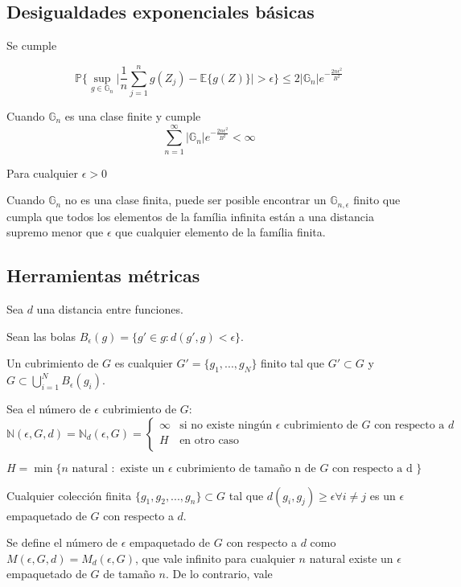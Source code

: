 \documentclass[12pt, a4paper]{article}
\begin{document}
\subsection{Desigualdades exponenciales básicas}
Se cumple 

$$ \mathds{P} \Bigg \{ \mathop{sup}_{g \in \mathds{G}_n} \Bigg | \frac{1}{n} \sum_{j=1}^{n} g(Z_j)-\mathds{E}\{ g(Z) \} \Bigg | > \epsilon \Bigg \} \leq 2 | \mathds{G}_n| e^{-\frac{2n\epsilon^2}{B^2}} $$

Cuando $\mathds{G}_n$ es una clase finite y cumple
$$ \sum_{n=1}^{\infty} |\mathds{G}_n| e^{- \frac{2n\epsilon^2}{B^2}} < \infty$$

Para cualquier $\epsilon>0$

Cuando $\mathds{G}_n$ no es una clase finita, puede ser posible encontrar un $\mathds{G}_{n,\epsilon}$ finito que cumpla que todos los elementos de la família infinita están a una distancia supremo menor que $\epsilon$ que cualquier elemento de la família finita.

\subsection{Herramientas métricas}

Sea $d$ una distancia entre funciones.

Sean las bolas $B_{\epsilon}(g)=\{ g' \in g:d(g',g)<\epsilon \}$.

Un cubrimiento de $G$ es cualquier $G'=\{ g_1,..., g_N \}$ finito tal que $G' \subset G $ y $G \subset \bigcup_{i=1}^N B_{\epsilon}(g_i)$.


Sea el número de $\epsilon$ cubrimiento de $G$:
$$\mathds{N}(\epsilon,G,d)=\mathds{N}_d(\epsilon,G)=
\begin{cases}
 \infty & \text{si no existe ningún $\epsilon$ cubrimiento de $G$ con respecto a $d$} \\

 H & \text{en otro caso}\\
\end{cases}$$

$$H=\mathop{min}\{ n \text{ natural } : \text{ existe un $\epsilon$ cubrimiento de tamaño n de $G$ con respecto a d } \}$$

Cualquier colección finita $\{ g_1, g_2, ..., g_n\} \subset G$ tal que $d(g_i,g_j)\geq\epsilon\forall i\neq j$ es un $\epsilon$ empaquetado de $G$ con respecto a $d$.

Se define el número de $\epsilon$ empaquetado de $G$ con respecto a $d$ como $M(\epsilon,G,d)=M_d(\epsilon,G)$, que vale infinito para cualquier $n$ natural existe un $\epsilon$ empaquetado de $G$ de tamaño $n$. De lo contrario, vale
\end{document}
